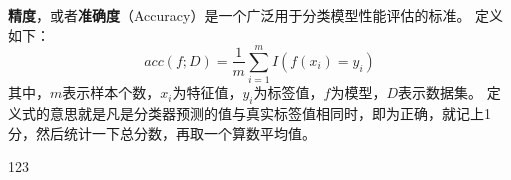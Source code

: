 
\textbf{精度}，或者\textbf{准确度}（Accuracy）是一个广泛用于分类模型性能评估的标准。
定义如下：
\begin{equation}
acc(f;D)=\frac{1}{m}\sum_{i=1}^mI(f(x_i)=y_i)
\end{equation}
其中，$m$表示样本个数，$x_i$为特征值，$y_i$为标签值，$f$为模型，$D$表示数据集。
定义式的意思就是凡是分类器预测的值与真实标签值相同时，即为正确，就记上1分，然后统计一下总分数，再取一个算数平均值。

123